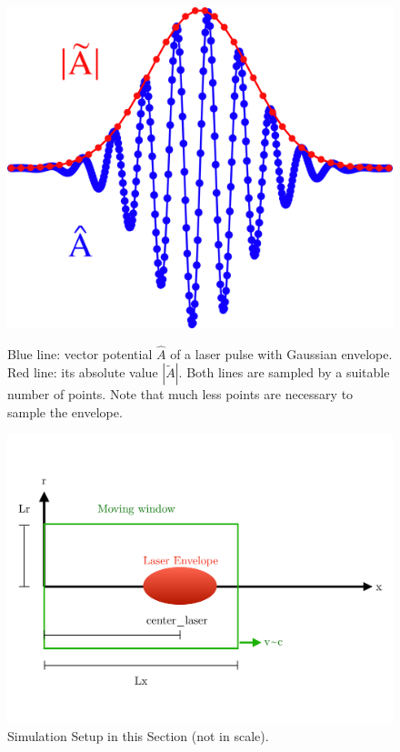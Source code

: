 \documentclass[a4paper,12pt]{extarticle}
\begin{document}
\begin{figure}[!htb]
   \begin{minipage}{0.35\textwidth}
     \centering
     \includegraphics[width=1\linewidth]{Envelope_Figure.png}
     \caption{Blue line: vector potential $\hat{A}$ of a laser pulse with Gaussian envelope. Red line: its absolute value $|\tilde{A}|$.  Both lines are sampled by a suitable number of points. Note that much less points are necessary to sample the envelope.}\label{fig:envelope}
   \end{minipage}\hfill
   \begin{minipage}{0.65\textwidth}
     \centering
     \includegraphics[width=1\linewidth]{Schema_Simulation_1.pdf}
     \caption{Simulation Setup in this Section (not in scale).}\label{Schema1}
   \end{minipage}
\end{figure}
\end{document}
